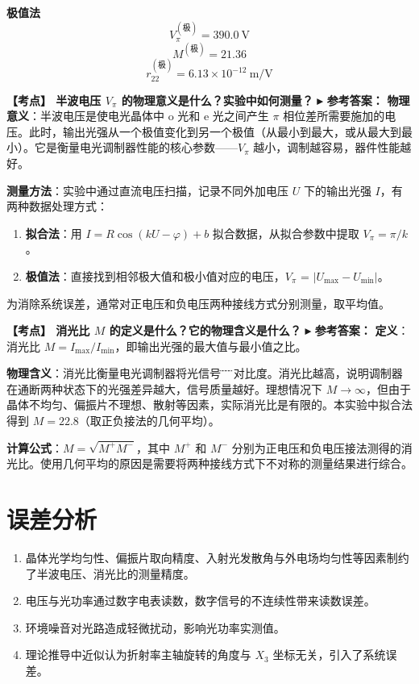 \documentclass[12pt,a4paper]{article}
\newcommand{\exam}[1]{\textbf{\color{blue!70!black}【考点】#1}}
\newcommand{\answer}[1]{\vspace{2pt}\noindent\textbf{\color{teal!80!black}▸ 参考答案：}#1\vspace{4pt}}
\newcommand{\qa}[2]{\exam{#1}\answer{#2}}
\begin{document}
\textbf{极值法}
\begin{equation}
    \boxed{V_\pi^{(\text{极})} = 390.0\ \text{V}}
\end{equation}
\begin{equation}
    \boxed{M^{(\text{极})} = 21.36}
\end{equation}
\begin{equation}
    \boxed{r_{22}^{(\text{极})} = 6.13 \times 10^{-12}\ \text{m/V}}
\end{equation}

\qa{
    半波电压 $V_\pi$ 的物理意义是什么？实验中如何测量？
}{
    \textbf{物理意义}：半波电压是使电光晶体中 o 光和 e 光之间产生 $\pi$ 相位差所需要施加的电压。此时，输出光强从一个极值变化到另一个极值（从最小到最大，或从最大到最小）。它是衡量电光调制器性能的核心参数——$V_\pi$ 越小，调制越容易，器件性能越好。

    \textbf{测量方法}：实验中通过直流电压扫描，记录不同外加电压 $U$ 下的输出光强 $I$，有两种数据处理方式：
    \begin{enumerate}
        \item \textbf{拟合法}：用 $I = R\cos(kU-\varphi)+b$ 拟合数据，从拟合参数中提取 $V_\pi = \pi/k$。
        \item \textbf{极值法}：直接找到相邻极大值和极小值对应的电压，$V_\pi$ = $|U_{\max} - U_{\min}|$。
    \end{enumerate}
    为消除系统误差，通常对正电压和负电压两种接线方式分别测量，取平均值。
}

\qa{
    消光比 $M$ 的定义是什么？它的物理含义是什么？
}{
    \textbf{定义}：消光比 $M = I_{\max}/I_{\min}$，即输出光强的最大值与最小值之比。

    \textbf{物理含义}：消光比衡量电光调制器将光信号\"开\"与\"关\"的对比度。消光比越高，说明调制器在通断两种状态下的光强差异越大，信号质量越好。理想情况下 $M \to \infty$，但由于晶体不均匀、偏振片不理想、散射等因素，实际消光比是有限的。本实验中拟合法得到 $M = 22.8$（取正负接法的几何平均）。

    \textbf{计算公式}：$M = \sqrt{M^+ M^-}$，其中 $M^+$ 和 $M^-$ 分别为正电压和负电压接法测得的消光比。使用几何平均的原因是需要将两种接线方式下不对称的测量结果进行综合。
}

\section{误差分析}
\begin{enumerate}
    \item 晶体光学均匀性、偏振片取向精度、入射光发散角与外电场均匀性等因素制约了半波电压、消光比的测量精度。
    \item 电压与光功率通过数字电表读数，数字信号的不连续性带来读数误差。
    \item 环境噪音对光路造成轻微扰动，影响光功率实测值。
    \item 理论推导中近似认为折射率主轴旋转的角度与 \(X_3\) 坐标无关，引入了系统误差。
\end{enumerate}
\end{document}
